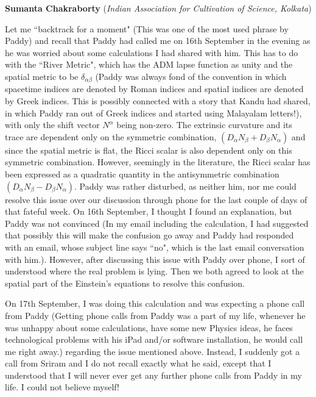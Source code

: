 \documentclass[prd, preprint, longbibliography, 11pt]{revtex4-1}
\begin{document}
\centerline{{\bf Sumanta Chakraborty} ({\it Indian Association for Cultivation of Science, Kolkata})}
\medskip
\noindent Let me ``backtrack for a moment" (This was one of the most used phrase by Paddy) and recall that Paddy had called me on 16th September in the evening as he was worried about some calculations I had shared with him. This has to do with the ``River Metric", which has the ADM lapse function as unity and the spatial metric to be $\delta_{\alpha \beta}$ (Paddy was always fond of the convention in which spacetime indices are denoted by Roman indices and spatial indices are denoted by Greek indices. This is possibly connected with a story that Kandu had shared, in which Paddy ran out of Greek indices and started using Malayalam letters!), with only the shift vector $N^{\alpha}$ being non-zero. The extrinsic curvature and its trace are dependent only on the symmetric combination, $(D_{\alpha}N_{\beta}+D_{\beta}N_{\alpha})$ and since the spatial metric is flat, the Ricci scalar is also dependent only on this symmetric combination. However, seemingly in the literature, the Ricci scalar has been expressed as a quadratic quantity in the antisymmetric combination $(D_{\alpha}N_{\beta}-D_{\beta}N_{\alpha})$. Paddy was rather disturbed, as neither him, nor me could resolve this issue over our discussion through phone for the last couple of days of that fateful week. On 16th September, I thought I found an explanation, but Paddy was not convinced (In my email including the calculation, I had suggested that possibly this will make the confusion go away and Paddy had responded with an email, whose subject line says ``no", which is the last email conversation with him.). However, after discussing this issue with Paddy over phone, I sort of understood where the real problem is lying. Then we both agreed to look at the spatial part of the Einstein's equations to resolve this confusion. 

On 17th September, I was doing this calculation and was expecting a phone call from Paddy (Getting phone calls from Paddy was a part of my life, whenever he was unhappy about some calculations, have some new Physics ideas, he faces technological problems with his iPad and/or software installation, he would call me right away.) regarding the issue mentioned above. Instead, I suddenly got a call from Sriram and I do not recall exactly what he said, except that I understood that I will never ever get any further phone calls from Paddy in my life. I could not believe myself!
\end{document}
